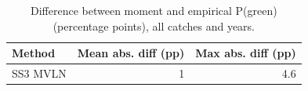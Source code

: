 \begin{table}[htbp]

\caption{\label{tab:approx}Difference between moment and empirical P(green) (percentage points), all catches and years.}
\centering
\begin{tabular}[t]{lrr}
\toprule
Method & Mean abs. diff (pp) & Max abs. diff (pp)\\
\midrule
SS3 MVLN & 1 & 4.6\\
\bottomrule
\end{tabular}
\end{table}
